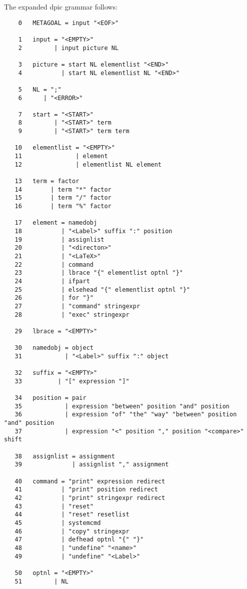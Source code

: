 \documentclass[11pt]{article}
\begin{document}
The expanded dpic grammar follows:
\begin{verbatim}
    0   METAGOAL = input "<EOF>" 

    1   input = "<EMPTY>" 
    2         | input picture NL 

    3   picture = start NL elementlist "<END>" 
    4           | start NL elementlist NL "<END>" 

    5   NL = ";" 
    6      | "<ERROR>" 

    7   start = "<START>" 
    8         | "<START>" term 
    9         | "<START>" term term 

   10   elementlist = "<EMPTY>" 
   11               | element 
   12               | elementlist NL element 

   13   term = factor 
   14        | term "*" factor 
   15        | term "/" factor 
   16        | term "%" factor 

   17   element = namedobj 
   18           | "<Label>" suffix ":" position 
   19           | assignlist 
   20           | "<directon>" 
   21           | "<LaTeX>" 
   22           | command 
   23           | lbrace "{" elementlist optnl "}" 
   24           | ifpart 
   25           | elsehead "{" elementlist optnl "}" 
   26           | for "}" 
   27           | "command" stringexpr 
   28           | "exec" stringexpr 

   29   lbrace = "<EMPTY>" 

   30   namedobj = object 
   31            | "<Label>" suffix ":" object 

   32   suffix = "<EMPTY>" 
   33          | "[" expression "]" 

   34   position = pair 
   35            | expression "between" position "and" position 
   36            | expression "of" "the" "way" "between" position "and" position 
   37            | expression "<" position "," position "<compare>" shift 

   38   assignlist = assignment 
   39              | assignlist "," assignment 

   40   command = "print" expression redirect 
   41           | "print" position redirect 
   42           | "print" stringexpr redirect 
   43           | "reset" 
   44           | "reset" resetlist 
   45           | systemcmd 
   46           | "copy" stringexpr 
   47           | defhead optnl "{" "}" 
   48           | "undefine" "<name>" 
   49           | "undefine" "<Label>" 

   50   optnl = "<EMPTY>" 
   51         | NL 


\end{verbatim}
\end{document}

